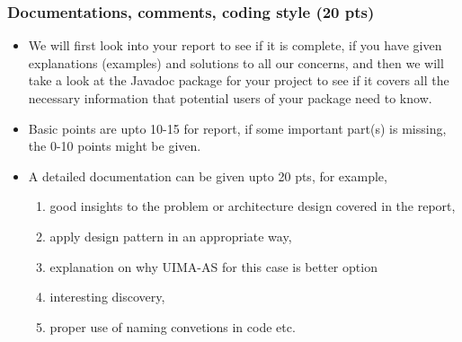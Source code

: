 \subsubsection{Documentations, comments, coding style (20 pts)}

\begin{itemize}

\item We will first look into your report to see if it is complete, if you have
given explanations (examples) and solutions to all our concerns, and then we will take a look at the Javadoc package for your project to see if it covers all the necessary information that potential users of your package need to know.

\item Basic points are upto 10-15 for report, if some
important part(s) is missing, the 0-10 points might be given.

\item A detailed documentation can be given upto 20 pts, for example,

\begin{enumerate}
\item good insights to the problem or architecture design covered in the report,
\item apply design pattern in an appropriate way,
\item explanation on why UIMA-AS for this case is better option
\item interesting discovery,
\item proper use of naming convetions in code etc.
\end{enumerate}


\end{itemize}
